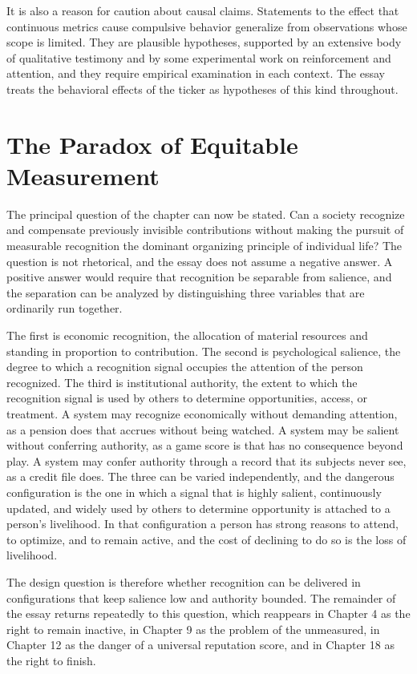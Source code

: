 \documentclass[11pt]{report}
\theoremstyle{definition}
\theoremstyle{remark}
\begin{document}
It is also a reason for caution about causal claims. Statements to the effect that continuous metrics cause compulsive behavior generalize from observations whose scope is limited. They are plausible hypotheses, supported by an extensive body of qualitative testimony and by some experimental work on reinforcement and attention, and they require empirical examination in each context. The essay treats the behavioral effects of the ticker as hypotheses of this kind throughout.

\section{The Paradox of Equitable Measurement}

The principal question of the chapter can now be stated. Can a society recognize and compensate previously invisible contributions without making the pursuit of measurable recognition the dominant organizing principle of individual life? The question is not rhetorical, and the essay does not assume a negative answer. A positive answer would require that recognition be separable from salience, and the separation can be analyzed by distinguishing three variables that are ordinarily run together.

The first is economic recognition, the allocation of material resources and standing in proportion to contribution. The second is psychological salience, the degree to which a recognition signal occupies the attention of the person recognized. The third is institutional authority, the extent to which the recognition signal is used by others to determine opportunities, access, or treatment. A system may recognize economically without demanding attention, as a pension does that accrues without being watched. A system may be salient without conferring authority, as a game score is that has no consequence beyond play. A system may confer authority through a record that its subjects never see, as a credit file does. The three can be varied independently, and the dangerous configuration is the one in which a signal that is highly salient, continuously updated, and widely used by others to determine opportunity is attached to a person's livelihood. In that configuration a person has strong reasons to attend, to optimize, and to remain active, and the cost of declining to do so is the loss of livelihood.

The design question is therefore whether recognition can be delivered in configurations that keep salience low and authority bounded. The remainder of the essay returns repeatedly to this question, which reappears in Chapter 4 as the right to remain inactive, in Chapter 9 as the problem of the unmeasured, in Chapter 12 as the danger of a universal reputation score, and in Chapter 18 as the right to finish.
\end{document}
